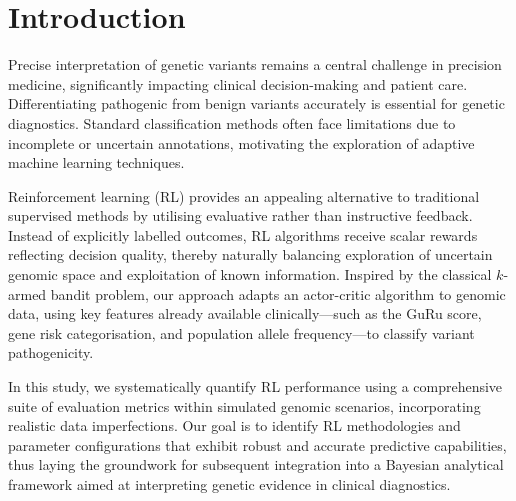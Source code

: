 \section{Introduction}
Precise interpretation of genetic variants remains a central challenge in precision medicine, significantly impacting clinical decision-making and patient care. Differentiating pathogenic from benign variants accurately is essential for genetic diagnostics. Standard classification methods often face limitations due to incomplete or uncertain annotations, motivating the exploration of adaptive machine learning techniques.

Reinforcement learning (RL) provides an appealing alternative to traditional supervised methods by utilising evaluative rather than instructive feedback. Instead of explicitly labelled outcomes, RL algorithms receive scalar rewards reflecting decision quality, thereby naturally balancing exploration of uncertain genomic space and exploitation of known information. Inspired by the classical $k$-armed bandit problem, our approach adapts an actor-critic algorithm to genomic data, using key features already available clinically—such as the GuRu score, gene risk categorisation, and population allele frequency—to classify variant pathogenicity.

In this study, we systematically quantify RL performance using a comprehensive suite of evaluation metrics within simulated genomic scenarios, incorporating realistic data imperfections. Our goal is to identify RL methodologies and parameter configurations that exhibit robust and accurate predictive capabilities, thus laying the groundwork for subsequent integration into a Bayesian analytical framework aimed at interpreting genetic evidence in clinical diagnostics.


